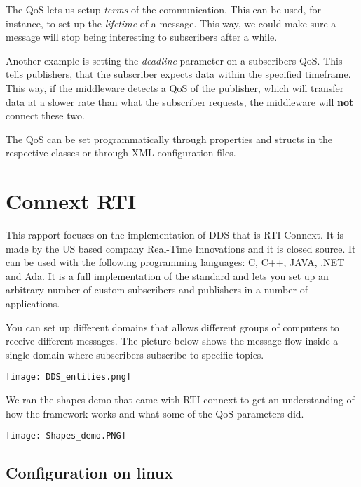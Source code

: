 The QoS lets us setup \textit{terms} of the communication. This can be used, for instance, to set up the \textit{lifetime} of a message. This way, we could make sure a message will stop being interesting to subscribers after a while. 

Another example is setting the \textit{deadline} parameter on a subscribers QoS. This tells publishers, that the subscriber expects data within the specified timeframe. This way, if the middleware detects a QoS of the publisher, which will transfer data at a slower rate than what the subscriber requests, the middleware will \textbf{not} connect these two.

The QoS can be set programmatically through properties and structs in the respective classes or through XML configuration files. 


\section{Connext RTI}
This rapport focuses on the implementation of DDS that is RTI Connext. It is made by the US based company Real-Time Innovations and it is closed source. It can be used with the following programming languages: C, C++, JAVA, .NET and Ada. 
It is a full implementation of the standard and lets you set up an arbitrary number of custom subscribers and publishers in a number of applications.

You can set up different domains that allows different groups of computers to receive different messages. The picture below shows the message flow inside a single domain where subscribers subscribe to specific topics.

\begin{center}
	\texttt{[image: DDS\_entities.png]}
\end{center}

We ran the shapes demo that came with RTI connext to get an understanding of how the framework works and what some of the QoS parameters did.

\begin{center}
	\texttt{[image: Shapes\_demo.PNG]}
\end{center}

\subsection{Configuration on linux}

